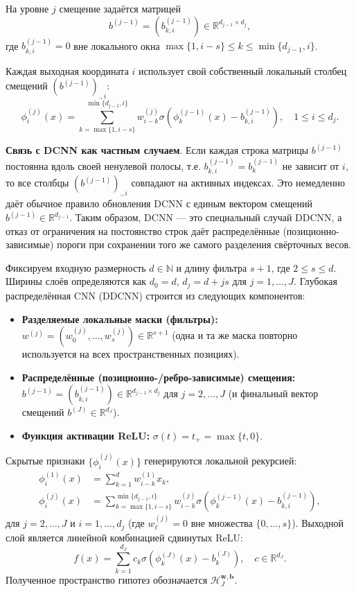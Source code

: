 \documentclass[../NDCNNAI_main.tex]{subfiles}
\begin{document}
\begin{definition}
На уровне $j$ смещение задаётся матрицей
\[
b^{(j-1)} = \left( b_{k,i}^{(j-1)} \right) \in \mathbb{R}^{d_{j-1} \times d_j},
\]
где $b_{k,i}^{(j-1)} = 0$ вне локального окна $\max\{1, i - s\} \leq k \leq \min\{d_{j-1}, i\}$.
\end{definition}

Каждая выходная координата $i$ использует свой собственный локальный столбец смещений $(b^{(j-1)})_{.,i}$:
\[
\phi_i^{(j)}(x) = \sum_{k=\max\{1, i-s\}}^{\min\{d_{j-1}, i\}} w_{i-k}^{(j)} \sigma\left( \phi_k^{(j-1)}(x) - b_{k,i}^{(j-1)} \right), \quad 1 \leq i \leq d_j.
\]

\textbf{Связь с DCNN как частным случаем}. Если каждая строка матрицы $b^{(j-1)}$ постоянна вдоль своей ненулевой полосы, т.е. $b_{k,i}^{(j-1)} = b_{k}^{(j-1)}$ не зависит от $i$, то все столбцы $(b^{(j-1)})_{.,i}$ совпадают на активных индексах. Это немедленно даёт обычное правило обновления DCNN с единым вектором смещений $b^{(j-1)} \in \mathbb{R}^{d_{j-1}}$. Таким образом, DCNN --- это специальный случай DDCNN, а отказ от ограничения на постоянство строк даёт распределённые (позиционно-зависимые) пороги при сохранении того же самого разделения свёрточных весов.

\begin{definition}
Фиксируем входную размерность $d \in \mathbb{N}$ и длину фильтра $s+1$, где $2 \leq s \leq d$. Ширины слоёв определяются как $d_0 = d$, $d_j = d + j s$ для $j = 1, \ldots, J$. Глубокая распределённая CNN (DDCNN) строится из следующих компонентов:
\begin{itemize}
    \item \textbf{Разделяемые локальные маски (фильтры):} $w^{(j)} = (w_0^{(j)}, \ldots, w_s^{(j)}) \in \mathbb{R}^{s+1}$ (одна и та же маска повторно используется на всех пространственных позициях).
    \item \textbf{Распределённые (позиционно-/ребро-зависимые) смещения:} $b^{(j-1)} = (b_{k,i}^{(j-1)}) \in \mathbb{R}^{d_{j-1} \times d_j}$ для $j = 2, \ldots, J$ (и финальный вектор смещений $b^{(J)} \in \mathbb{R}^{d_J}$).
    \item \textbf{Функция активации ReLU:} $\sigma(t) = t_+ = \max\{t, 0\}$.
\end{itemize}
Скрытые признаки $\{\phi_i^{(j)}(x)\}$ генерируются локальной рекурсией:
\begin{align*}
    \phi_i^{(1)}(x) &= \sum_{k=1}^{d} w_{i-k}^{(1)} x_k, \\
    \phi_i^{(j)}(x) &= \sum_{k=\max\{1, i-s\}}^{\min\{d_{j-1}, i\}} w_{i-k}^{(j)} \sigma\left( \phi_k^{(j-1)}(x) - b_{k,i}^{(j-1)} \right),
\end{align*}
для $j = 2, \ldots, J$ и $i = 1, \ldots, d_j$ (где $w_{\ell}^{(j)} = 0$ вне множества $\{0, \ldots, s\}$). Выходной слой является линейной комбинацией сдвинутых ReLU:
\[
f(x) = \sum_{k=1}^{d_J} c_k \sigma\left( \phi_k^{(J)}(x) - b_k^{(J)} \right), \quad c \in \mathbb{R}^{d_J}.
\]
Полученное пространство гипотез обозначается $\mathcal{H}_{J}^{\mathbf{w},\mathbf{b}}$.
\end{definition}
\end{document}
